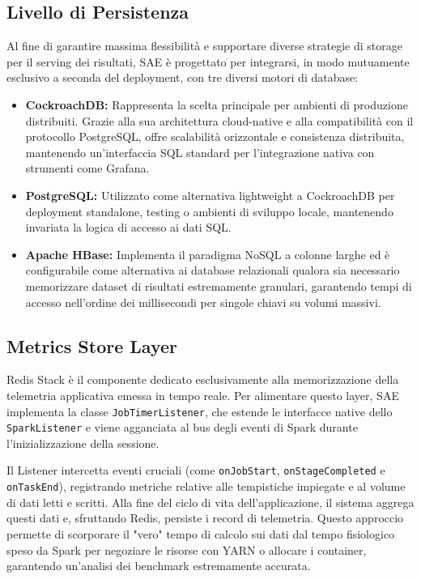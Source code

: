 \documentclass[conference]{IEEEtran}
\begin{document}
\subsection{Livello di Persistenza}\label{subsec:persistence_layer}
Al fine di garantire massima flessibilità e supportare diverse strategie di storage per il serving dei risultati, SAE è progettato per integrarsi, in modo mutuamente esclusivo a seconda del deployment, con tre diversi motori di database:

\begin{itemize}
    \item \textbf{CockroachDB:} Rappresenta la scelta principale per ambienti di produzione distribuiti.
    Grazie alla sua architettura cloud-native e alla compatibilità con il protocollo PostgreSQL, offre scalabilità orizzontale e consistenza distribuita, mantenendo un'interfaccia SQL standard per l'integrazione nativa con strumenti come Grafana.
    \item \textbf{PostgreSQL:} Utilizzato come alternativa lightweight a CockroachDB per deployment standalone, testing o ambienti di sviluppo locale, mantenendo invariata la logica di accesso ai dati SQL.
    \item \textbf{Apache HBase:} Implementa il paradigma NoSQL a colonne larghe ed è configurabile come alternativa ai database relazionali qualora sia necessario memorizzare dataset di risultati estremamente granulari, garantendo tempi di accesso nell'ordine dei millisecondi per singole chiavi su volumi massivi.
\end{itemize}

\subsection{Metrics Store Layer}\label{subsec:metrics_store_layer}
Redis Stack è il componente dedicato esclusivamente alla memorizzazione della telemetria applicativa emessa in tempo reale. 
Per alimentare questo layer, SAE implementa la classe \texttt{JobTimerListener}, che estende le interfacce native dello \texttt{SparkListener} e viene agganciata al bus degli eventi di Spark durante l'inizializzazione della sessione.

Il Listener intercetta eventi cruciali (come \texttt{onJobStart}, \texttt{onStageCompleted} e \texttt{onTaskEnd}), registrando metriche relative alle tempistiche impiegate e al volume di dati letti e scritti.
Alla fine del ciclo di vita dell'applicazione, il sistema aggrega questi dati e, sfruttando Redis, persiste i record di telemetria.
Questo approccio permette di scorporare il "vero" tempo di calcolo sui dati dal tempo fisiologico speso da Spark per negoziare le risorse con YARN o allocare i container, garantendo un'analisi dei benchmark estremamente accurata.
\end{document}
